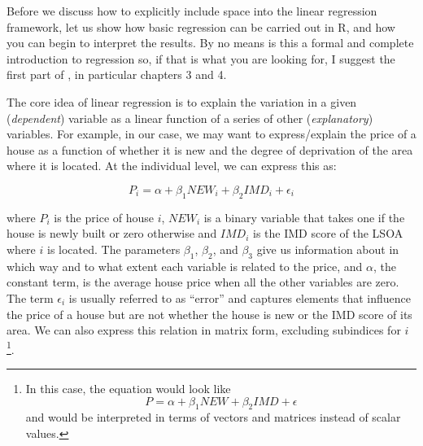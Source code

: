 \documentclass[
]{book}
\begin{document}
Before we discuss how to explicitly include space into the linear regression framework, let us show how basic regression can be carried out in R, and how you can begin to interpret the results. By no means is this a formal and complete introduction to regression so, if that is what you are looking for, I suggest the first part of \citet{gelman2006data}, in particular chapters 3 and 4.

The core idea of linear regression is to explain the variation in a given (\emph{dependent}) variable as a linear function of a series of other (\emph{explanatory}) variables. For example, in our case, we may want to express/explain the price of a house as a function of whether it is new and the degree of deprivation of the area where it is located. At the individual level, we can express this as:

\[
P_i = \alpha + \beta_1 NEW_i + \beta_2 IMD_i + \epsilon_i
\]

where \(P_i\) is the price of house \(i\), \(NEW_i\) is a binary variable that takes one if the house is newly built or zero otherwise and \(IMD_i\) is the IMD score of the LSOA where \(i\) is located. The parameters \(\beta_1\), \(\beta_2\), and \(\beta_3\) give us information about in which way and to what extent each variable is related to the price, and \(\alpha\), the constant term, is the average house price when all the other variables are zero. The term \(\epsilon_i\) is usually referred to as ``error'' and captures elements that influence the price of a house but are not whether the house is new or the IMD score of its area. We can also express this relation in matrix form, excluding subindices for \(i\)\footnote{In this case, the equation would look like \[P = \alpha + \beta_1 NEW + \beta_2 IMD + \epsilon\] and would be interpreted in terms of vectors and matrices instead of scalar values.}.
\end{document}
